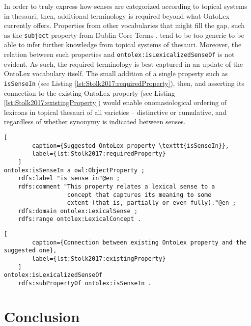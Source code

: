 In order to truly express how senses are categorized according to topical systems in thesauri, then, additional terminology is required beyond what OntoLex currently offers. Properties from other vocabularies that might fill the gap, such as the \texttt{subject} property from Dublin Core Terms \cite{noauthor_dcmi_2012}, tend to be too generic to be able to infer further knowledge from topical systems of thesauri. Moreover, the relation between such properties and \texttt{ontolex:isLexicalizedSenseOf} is not evident. As such, the required terminology is best captured in an update of the OntoLex vocabulary itself. The small addition of a single property such as \texttt{isSenseIn} (see Listing \ref{lst:Stolk2017:requiredProperty}), then, and asserting its connection to the existing OntoLex property (see Listing \ref{lst:Stolk2017:existingProperty}) would enable onomasiological ordering of lexicons in topical thesauri of all varieties -- distinctive or cumulative, and regardless of whether synonymy is indicated between senses.

\noindent
\begin{minipage}[c]{\textwidth}
	\begin{lstlisting}[
		caption={Suggested OntoLex property \texttt{isSenseIn}},
		label={lst:Stolk2017:requiredProperty}
	]
ontolex:isSenseIn a owl:ObjectProperty ;
	rdfs:label "is sense in"@en ;
	rdfs:comment "This property relates a lexical sense to a
	              concept that captures its meaning to some
	              extent (that is, partially or even fully)."@en ;
	rdfs:domain ontolex:LexicalSense ;
	rdfs:range ontolex:LexicalConcept .
	\end{lstlisting}
\end{minipage}

\noindent
\begin{minipage}[c]{\textwidth}
	\begin{lstlisting}[
		caption={Connection between existing OntoLex property and the suggested one},
		label={lst:Stolk2017:existingProperty}
	]
ontolex:isLexicalizedSenseOf 
	rdfs:subPropertyOf ontolex:isSenseIn . 
	\end{lstlisting}
\end{minipage}


\section{Conclusion}

